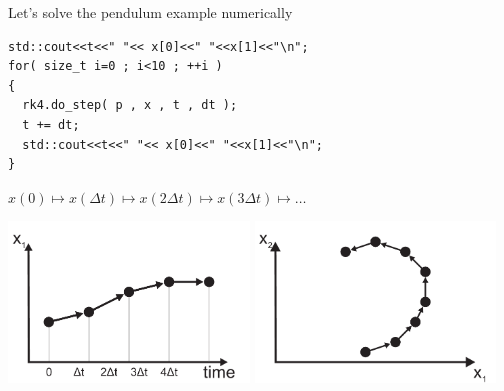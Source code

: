 \begin{frame}[fragile]
 \centerline{ \Large Let's solve the pendulum example numerically}

\vspace{2ex}


\begin{lstlisting}
std::cout<<t<<" "<< x[0]<<" "<<x[1]<<"\n";
for( size_t i=0 ; i<10 ; ++i )
{
  rk4.do_step( p , x , t , dt );
  t += dt;
  std::cout<<t<<" "<< x[0]<<" "<<x[1]<<"\n";
}
\end{lstlisting}

\vspace{1ex}

\centerline{$x(0) \mapsto x(\Delta t) \mapsto x(2\Delta t) \mapsto x(3\Delta t) \mapsto \dots$}

\vspace{1ex}

\centerline{\includegraphics[draft=false,width=0.48\textwidth]{stepper_temporal_evolution.pdf}
\hspace{1ex}
\includegraphics[draft=false,width=0.48\textwidth]{stepper_phase_space.pdf}}
\end{frame}


